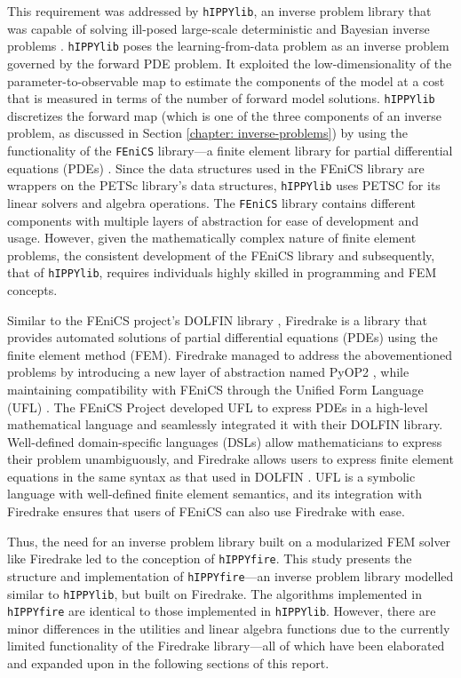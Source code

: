 This requirement was addressed by \texttt{hIPPYlib}, an inverse problem library that was capable of solving ill-posed large-scale deterministic and Bayesian inverse problems \cite{villa2018hippylib}. \texttt{hIPPYlib} poses the learning-from-data problem as an inverse problem governed by the forward PDE problem. It exploited the low-dimensionality of the parameter-to-observable map to estimate the components of the model at a cost that is measured in terms of the number of forward model solutions. \texttt{hIPPYlib} discretizes the forward map (which is one of the three components of an inverse problem, as discussed in Section \ref{chapter: inverse-problems}) by using the functionality of the \texttt{FEniCS} library---a finite element library for partial differential equations (PDEs) \cite{alnaes2015fenics}. Since the data structures used in the FEniCS library are wrappers on the PETSc library's data structures, \texttt{hIPPYlib} uses PETSC \cite{balay2001petsc} for its linear solvers and algebra operations. The \texttt{FEniCS} library contains different components with multiple layers of abstraction for ease of development and usage. However, given the mathematically complex nature of finite element problems, the consistent development of the FEniCS library and subsequently, that of \texttt{hIPPYlib}, requires individuals highly skilled in programming and FEM concepts.

Similar to the FEniCS project's DOLFIN library \cite{alnaes2015fenics, logg2010dolfin}, Firedrake \cite{rathgeber2016firedrake} is a library that provides automated solutions of partial differential equations (PDEs) using the finite element method (FEM). Firedrake managed to address the abovementioned problems by introducing a new layer of abstraction named PyOP2 \cite{rathgeber2012pyop2}, while maintaining compatibility with FEniCS through the Unified Form Language (UFL) \cite{alnaes2014unified}. The FEniCS Project developed UFL \cite{alnaes2014unified} to express PDEs in a high-level mathematical language and seamlessly integrated it with their DOLFIN library. Well-defined domain-specific languages (DSLs) allow mathematicians to express their problem unambiguously, and Firedrake allows users to express finite element equations in the same syntax as that used in DOLFIN \cite{logg2010dolfin}. UFL is a symbolic language with well-defined finite element semantics, and its integration with Firedrake ensures that users of FEniCS can also use Firedrake with ease.  

Thus, the need for an inverse problem library built on a modularized FEM solver like Firedrake led to the conception of \texttt{hIPPYfire}. This study presents the structure and implementation of \texttt{hIPPYfire}---an inverse problem library modelled similar to \texttt{hIPPYlib}, but built on Firedrake. The algorithms implemented in \texttt{hIPPYfire} are identical to those implemented in \texttt{hIPPYlib}. However, there are minor differences in the utilities and linear algebra functions due to the currently limited functionality of the Firedrake library---all of which have been elaborated and expanded upon in the following sections of this report.

